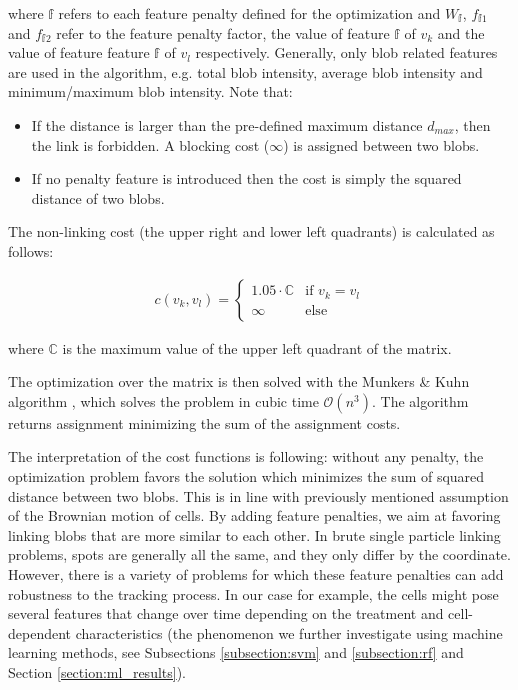 \documentclass[pdftex,12pt,a4paper]{report}
\begin{document}
where $\mathbb{f}$ refers to each feature penalty defined for the optimization and $W_{\mathbb{f}}$, $f_{\mathbb{f}1}$ and $f_{\mathbb{f}2}$ refer to the feature penalty factor, the value of feature $\mathbb{f}$ of $v_k$ and the value of feature feature $\mathbb{f}$ of $v_l$ respectively. Generally, only blob related features are used in the algorithm, e.g. total blob intensity, average blob intensity and minimum/maximum blob intensity. Note that:

\begin{itemize}
\item If the distance is larger than the pre-defined maximum distance $d_{max}$, then the link is forbidden. A blocking cost ($\infty$) is assigned between two blobs.
\item If no penalty feature is introduced then the cost is simply the squared distance of two blobs.
\end{itemize}

The non-linking cost (the upper right and lower left quadrants) is calculated as follows:

\begin{gather*}
c(v_k, v_l) =
\begin{cases}
  1.05 \cdot \mathbb{C} & \text{if } v_k = v_l \\
  \infty & \text{else}  
\end{cases}
\end{gather*}

where $\mathbb{C}$ is the maximum value of the upper left quadrant of the matrix.

The optimization over the matrix is then solved with the Munkers \& Kuhn algorithm \cite{munkres1957algorithms}, which solves the problem in cubic time $\mathcal{O}(n^3)$. The algorithm returns assignment minimizing the sum of the assignment costs.

The interpretation of the cost functions is following: without any penalty, the optimization problem favors the solution which minimizes the sum of squared distance between two blobs. This is in line with previously mentioned assumption of the Brownian motion of cells. By adding feature penalties, we aim at favoring linking blobs that are more similar to each other. In brute single particle linking problems, spots are generally all the same, and they only differ by the coordinate. However, there is a variety of problems for which these feature penalties can add robustness to the tracking process. In our case for example, the cells might pose several features that change over time depending on the treatment and cell-dependent characteristics (the phenomenon we further investigate using machine learning methods, see Subsections \ref{subsection:svm} and \ref{subsection:rf} and Section \ref{section:ml_results}).
\end{document}
